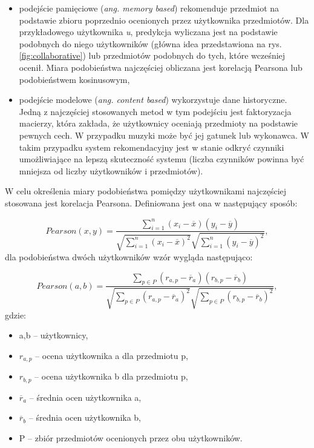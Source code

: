 \begin{itemize}
    \item podejście pamięciowe (\textit{ang. memory based}) rekomenduje przedmiot na podstawie zbioru poprzednio ocenionych przez użytkownika przedmiotów. Dla przykładowego użytkownika \textit{u}, predykcja wyliczana jest na podstawie podobnych do niego użytkowników (główna idea przedstawiona na rys. \ref{fig:collaborative}) lub przedmiotów podobnych do tych, które wcześniej ocenił. Miara podobieństwa najczęściej obliczana jest korelacją Pearsona lub podobieństwem kosinusowym,
    \item podejście modelowe (\textit{ang. content based}) wykorzystuje dane historyczne. Jedną z najczęściej stosowanych metod w tym podejściu jest faktoryzacja macierzy, która zakłada, że użytkownicy oceniają przedmioty na podstawie pewnych cech. W przypadku muzyki może być jej gatunek lub wykonawca. W takim przypadku system rekomendacyjny jest w stanie odkryć czynniki umożliwiające na lepszą skuteczność systemu (liczba czynników powinna być mniejsza od liczby użytkowników i przedmiotów). 
\end{itemize}

W celu określenia miary podobieństwa pomiędzy użytkownikami najczęściej stosowana jest korelacja Pearsona. Definiowana jest ona w następujący sposób:

\begin{equation}
Pearson(x,y) = \frac{\sum\limits_{i=1}^n(x_i - \overline{x})(y_i - \overline{y})}{\sqrt{\sum\limits_{i=1}^n(x_i - \overline{x})^2}\sqrt{\sum\limits_{i=1}^n(y_i - \overline{y})^2}},
\end{equation}
dla podobieństwa dwóch użytkowników wzór wygląda następująco:

\begin{equation}
Pearson(a,b) = \frac{\sum\limits_{p \in P}(r_{a,p} - \overline{r}_a)(r_{b,p} - \overline{r}_b)}{\sqrt{\sum\limits_{p \in P}(r_{a,p} - \overline{r}_a)^2}\sqrt{\sum\limits_{p \in P}(r_{b,p} - \overline{r}_b)^2}},
\end{equation} gdzie:
\begin{itemize}
    \item a,b -- użytkownicy,
    \item $r_{a,p}$ -- ocena użytkownika a dla przedmiotu p,
    \item $r_{b,p}$ -- ocena użytkownika b dla przedmiotu p,
    \item $\overline{r}_a$ -- średnia ocen użytkownika a,
    \item $\overline{r}_b$ -- średnia ocen użytkownika b,
    \item P -- zbiór przedmiotów ocenionych przez obu użytkowników.
\end{itemize}

